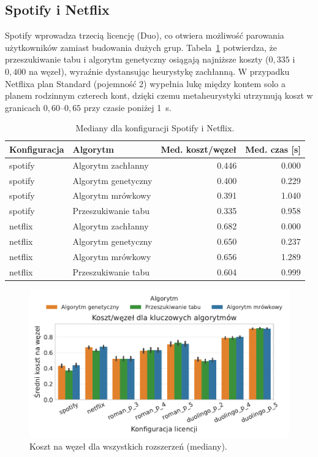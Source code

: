 \subsection{Spotify i Netflix}

Spotify wprowadza trzecią licencję (Duo), co otwiera możliwość parowania użytkowników zamiast budowania dużych grup. Tabela~\ref{tab:ext-additional-static} potwierdza, że przeszukiwanie tabu i algorytm genetyczny osiągają najniższe koszty ($0{,}335$ i $0{,}400$ na węzeł), wyraźnie dystansując heurystykę zachłanną. W przypadku Netflixa plan Standard (pojemność 2) wypełnia lukę między kontem solo a planem rodzinnym czterech kont, dzięki czemu metaheurystyki utrzymują koszt w granicach $0{,}60$--$0{,}65$ przy czasie poniżej 1~s.

\begin{table}[H]
  \centering
  \caption{Mediany dla konfiguracji Spotify i Netflix.}
  \label{tab:ext-additional-static}
  \begin{tabular}{llrr}
    \toprule
    \textbf{Konfiguracja} & \textbf{Algorytm}   & \textbf{Med. koszt/węzeł} & \textbf{Med. czas [s]} \\
    \midrule
    spotify               & Algorytm zachłanny  & 0.446                     & 0.000                  \\
    spotify               & Algorytm genetyczny & 0.400                     & 0.229                  \\
    spotify               & Algorytm mrówkowy   & 0.391                     & 1.040                  \\
    spotify               & Przeszukiwanie tabu & 0.335                     & 0.958                  \\
    netflix               & Algorytm zachłanny  & 0.682                     & 0.000                  \\
    netflix               & Algorytm genetyczny & 0.650                     & 0.237                  \\
    netflix               & Algorytm mrówkowy   & 0.656                     & 1.289                  \\
    netflix               & Przeszukiwanie tabu & 0.604                     & 0.999                  \\
  \end{tabular}
\end{table}

\begin{figure}[H]
  \centering
  \includegraphics[width=0.6\linewidth]{assets/figures/extensions/static/cost_per_node_by_license_targets.pdf}
  \caption{Koszt na węzeł dla wszystkich rozszerzeń (mediany).}
  \label{fig:ext-license-cost}
\end{figure}


